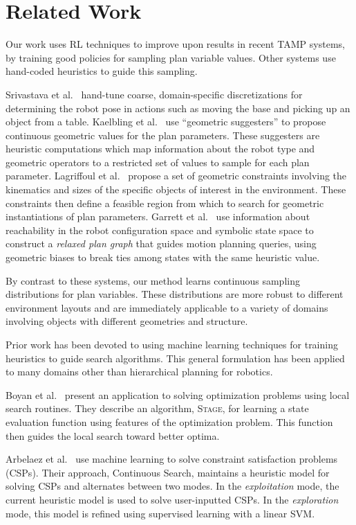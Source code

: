 \section{Related Work}
Our work uses RL techniques to improve upon results in recent TAMP systems,
by training good policies for sampling plan variable values. Other
systems use hand-coded heuristics to guide this sampling.

Srivastava et al.~\cite{srivastava2014combined} hand-tune coarse, domain-specific discretizations
for determining the robot pose in actions such as moving the base and picking up an object from a table.
Kaelbling et al.~\cite{kaelbling2011hierarchical} use ``geometric suggesters'' to propose
continuous geometric values for the plan parameters. These suggesters are heuristic
computations which map information about the robot type and geometric operators to a restricted
set of values to sample for each plan parameter. Lagriffoul et al.~\cite{lagriffoul2014orientation}
propose a set of geometric constraints involving the kinematics and sizes of the specific objects of
interest in the environment. These constraints then define a feasible region from which to search
for geometric instantiations of plan parameters. Garrett et al.~\cite{GarrettWAFR14} use information
about reachability in the robot configuration space and symbolic state space to construct a
\emph{relaxed plan graph} that guides motion planning queries, using geometric biases to break ties
among states with the same heuristic value.

By contrast to these systems, our method learns continuous sampling distributions for plan variables.
These distributions are more robust to different environment layouts and are immediately applicable to a
variety of domains involving objects with different geometries and structure.

Prior work has been devoted to using machine learning techniques for
training heuristics to guide search algorithms. This general formulation
has been applied to many domains other than hierarchical planning for robotics.

Boyan et al.~\cite{Boyanlearning} present an application to solving optimization
problems using local search routines. They describe an algorithm, \textsc{Stage},
for learning a state evaluation function using features of the optimization problem.
This function then guides the local search toward better optima.

Arbelaez et al.~\cite{hamadisearch} use machine learning to solve constraint
satisfaction problems (CSPs). Their approach, Continuous Search, maintains a heuristic
model for solving CSPs and alternates between two modes. In the \emph{exploitation} mode,
the current heuristic model is used to solve user-inputted CSPs. In the \emph{exploration}
mode, this model is refined using supervised learning with a linear SVM.

